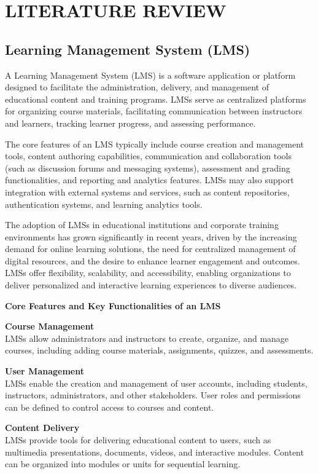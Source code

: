 \newpage
\chapter{LITERATURE REVIEW}

\section{Learning Management System (LMS)}

A Learning Management System (LMS) is a software application or platform designed to facilitate the administration, delivery, and management of educational content and training programs. LMSs serve as centralized platforms for organizing course materials, facilitating communication between instructors and learners, tracking learner progress, and assessing performance.

The core features of an LMS typically include course creation and management tools, content authoring capabilities, communication and collaboration tools (such as discussion forums and messaging systems), assessment and grading functionalities, and reporting and analytics features. LMSs may also support integration with external systems and services, such as content repositories, authentication systems, and learning analytics tools.

The adoption of LMSs in educational institutions and corporate training environments has grown significantly in recent years, driven by the increasing demand for online learning solutions, the need for centralized management of digital resources, and the desire to enhance learner engagement and outcomes. LMSs offer flexibility, scalability, and accessibility, enabling organizations to deliver personalized and interactive learning experiences to diverse audiences.

\textbf{Core Features and Key Functionalities of an LMS}

\textbf{Course Management}\\
LMSs allow administrators and instructors to create, organize, and manage courses, including adding course materials, assignments, quizzes, and assessments.

\textbf{User Management}\\
LMSs enable the creation and management of user accounts, including students, instructors, administrators, and other stakeholders. User roles and permissions can be defined to control access to courses and content.

\textbf{Content Delivery}\\
LMSs provide tools for delivering educational content to users, such as multimedia presentations, documents, videos, and interactive modules. Content can be organized into modules or units for sequential learning.

